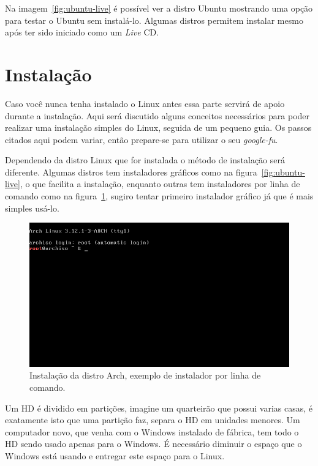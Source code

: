 \documentclass{handout_utfpr}
\begin{document}
Na imagem~\ref{fig:ubuntu-live} é possível ver a distro Ubuntu mostrando uma opção para testar o Ubuntu sem instalá-lo. Algumas distros permitem instalar mesmo após ter sido iniciado como um \textit{Live} CD.

\section{Instalação}
Caso você nunca tenha instalado o Linux antes essa parte servirá de apoio durante a instalação. Aqui será discutido alguns conceitos necessários para poder realizar uma instalação simples do Linux, seguida de um pequeno guia. Os passos citados aqui podem variar, então prepare-se para utilizar o seu \emph{google-fu}.

Dependendo da distro Linux que for instalada o método de instalação será diferente. Algumas distros tem instaladores gráficos como na figura~\ref{fig:ubuntu-live}, o que facilita a instalação, enquanto outras tem instaladores por linha de comando como na figura~\ref{fig:arch-installer}, sugiro tentar primeiro instalador gráfico já que é mais simples usá-lo.

\begin{figure}[H]
    \centering
    \includegraphics[scale=.5]{imagens/arch-install-01.png}
    \caption{Instalação da distro Arch, exemplo de instalador por linha de comando.}
    \label{fig:arch-installer}
\end{figure}

Um HD é dividido em partições, imagine um quarteirão que possui varias casas, é exatamente isto que uma partição faz, separa o HD em unidades menores. Um computador novo, que venha com o Windows instalado de fábrica, tem todo o HD sendo usado apenas para o Windows. É necessário diminuir o espaço que o Windows está usando e entregar este espaço para o Linux.
\end{document}
